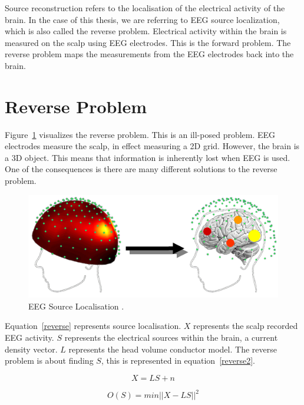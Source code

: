 Source reconstruction refers to the localisation of the electrical activity of the brain. In the case of this thesis, we are referring to EEG source localization, which is also called the reverse problem. Electrical activity within the brain is measured on the scalp using EEG electrodes. This is the forward problem. The reverse problem maps the measurements from the EEG electrodes back into the brain. 

\section{Reverse Problem}

Figure~\ref{source-local-img} visualizes the reverse problem. This is an ill-posed problem. EEG electrodes measure the scalp, in effect measuring a 2D grid. However, the brain is a 3D object. This means that information is inherently lost when EEG is used. One of the consequences is there are many different solutions to the reverse problem. 

\begin{figure}[!htb]
\caption{EEG Source Localisation \cite{source-loc-img}.}
\label{source-local-img}
    \centering
    \includegraphics[width=\textwidth]{fig/source_recon}
\end{figure}

Equation~\ref{reverse} represents source localisation. $X$ represents the scalp recorded EEG activity. $S$ represents the electrical sources within the brain, a current density vector. $L$ represents the head volume conductor model. The reverse problem is about finding $S$, this is represented in equation~\ref{reverse2}.

\begin{equation}\label{reverse}
X = LS + n
\end{equation}

\begin{equation}\label{reverse2}
O(S) = min||X - LS||^2 
\end{equation}

